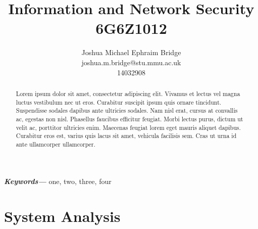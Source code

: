 \documentclass[11pt]{article}
\title{\vspace{2cm}\textbf{Information and Network Security}\\6G6Z1012}
\author{Joshua Michael Ephraim Bridge\\joshua.m.bridge@stu.mmu.ac.uk\\14032908}
\providecommand{\keywords}[1]
{
  \small
  \textbf{\textit{Keywords---}} #1
}
\begin{document}
\maketitle

\vspace{1cm}

\begin{abstract}
Lorem ipsum dolor sit amet, consectetur adipiscing elit. Vivamus et lectus vel magna luctus vestibulum nec ut eros. Curabitur suscipit ipsum quis ornare tincidunt. Suspendisse sodales dapibus ante ultricies sodales. Nam nisl erat, cursus at convallis ac, egestas non nisl. Phasellus faucibus efficitur feugiat. Morbi lectus purus, dictum ut velit ac, porttitor ultricies enim. Maecenas feugiat lorem eget mauris aliquet dapibus. Curabitur eros est, varius quis lacus sit amet, vehicula facilisis sem. Cras ut urna id ante ullamcorper ullamcorper.
\end{abstract}

\vspace{0.5cm}

\keywords{one, two, three, four}

\newpage

\tableofcontents



\section{System Analysis}


\newpage



\end{document}

